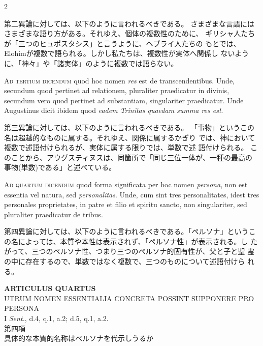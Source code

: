 \documentclass[paper=a4paper,fontsize=10pt,jafontsize=9pt,titlepage]{jlreq}
\begin{document}
\begin{paracol}{2}
\switchcolumn

第二異論に対しては、以下のように言われるべきである。
さまざまな言語にはさまざまな語り方がある。それゆえ、個体の複数性のために、
 ギリシャ人たちが「三つのヒュポスタシス」と言うように、ヘブライ人たちの
 もとでは、Elohimが複数で語られる。しかし私たちは、複数性が実体へ関係し
 ないように、「神々」や「諸実体」のように複数では語らない。

\switchcolumn*

{\scshape Ad tertium dicendum} quod hoc nomen {\itshape res} est de transcendentibus. Unde,
secundum quod pertinet ad relationem, pluraliter praedicatur in divinis,
secundum vero quod pertinet ad substantiam, singulariter
praedicatur. Unde Augustinus dicit ibidem quod {\itshape eadem Trinitas quaedam
summa res est}.

\switchcolumn

第三異論に対しては、以下のように言われるべきである。
「事物」というこの名は超越的なものに属する。それゆえ、関係に属するかぎり
 では、神において複数で述語付けられるが、実体に属する限りでは、単数で述
 語付けられる。
このことから、アウグスティヌスは、同箇所で「同じ三位一体が、一種の最高の
 事物(単数)である」と述べている。

\switchcolumn*

{\scshape Ad quartum dicendum} quod forma significata per hoc nomen {\itshape persona}, non
est essentia vel natura, sed {\itshape personalitas}. Unde, cum sint tres
personalitates, idest tres personales proprietates, in patre et filio et
spiritu sancto, non singulariter, sed pluraliter praedicatur de tribus.

\switchcolumn

第四異論に対しては、以下のように言われるべきである。「ペルソナ」というこ
 の名によっては、本質や本性は表示されず、「ペルソナ性」が表示される。し
 たがって、三つのペルソナ性、つまり三つのペルソナ的固有性が、父と子と聖
 霊の中に存在するので、単数ではなく複数で、三つのものについて述語付けら
 れる。

\switchcolumn*

\end{paracol}
\newpage





\begin{center}
 {\Large {\bfseries ARTICULUS QUARTUS}}\\
 {\large UTRUM NOMEN ESSENTIALIA CONCRETA POSSINT SUPPONERE PRO PERSONA}\\
 {\footnotesize I {\itshape Sent.}, d.4, q.1, a.2; d.5, q.1, a.2.}\\
 {\Large 第四項\\具体的な本質的名称はペルソナを代示しうるか}
\end{center}
\end{document}
